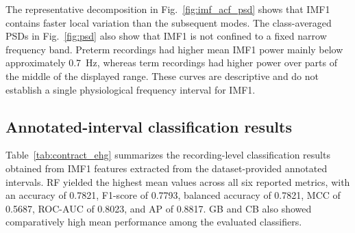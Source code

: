 \documentclass[10pt,letterpaper]{article}
\begin{document}
The representative decomposition in Fig.~\ref{fig:imf_acf_psd} shows that IMF1 contains faster local variation than the subsequent modes. The class-averaged PSDs in Fig.~\ref{fig:psd} also show that IMF1 is not confined to a fixed narrow frequency band. Preterm recordings had higher mean IMF1 power mainly below approximately 0.7~Hz, whereas term recordings had higher power over parts of the middle of the displayed range. These curves are descriptive and do not establish a single physiological frequency interval for IMF1.

\subsection*{Annotated-interval classification results}

Table~\ref{tab:contract_ehg} summarizes the recording-level classification results obtained from IMF1 features extracted from the dataset-provided annotated intervals. RF yielded the highest mean values across all six reported metrics, with an accuracy of 0.7821, F1-score of 0.7793, balanced accuracy of 0.7821, MCC of 0.5687, ROC-AUC of 0.8023, and AP of 0.8817. GB and CB also showed comparatively high mean performance among the evaluated classifiers.

\begin{table}[!htbp]
\centering
\caption{\textbf{Recording-level classification performance for annotated-interval segmentation using IMF1 features.} Values are means across 30 complete repetition-level out-of-fold evaluations. Preterm delivery was treated as the positive class.}
\label{tab:contract_ehg}
\end{table}
\FloatBarrier
\end{document}
